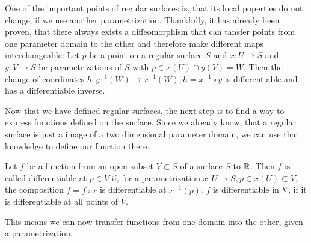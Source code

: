One of the important points of regular surfaces is, that its local poperties do not change, if we use another parametrization.
Thankfully, it has already been proven, that there always exists a diffeomorphism that can tansfer points from one parameter domain to the other and therefore make different maps interchangeable:
Let $p$ be a point on a regular surface $S$ and $x: U \rightarrow S$ and $y: V \rightarrow S$ be parametrizations of $S$ with $p \in x(U) \cap y(V) = W$.
Then the change of coordinates $h: y^{-1}(W) \rightarrow x^{-1}(W), h = x^{-1} \circ y$ is differentiable and has a differentiable inverse.

Now that we have defined regular surfaces, the next step is to find a way to express functions defined on the surface.
Since we already know, that a regular surface is just a image of a two dimensional parameter domain, we can use that knowledge to define our function there.
\begin{mydef}
	Let $f$ be a function from an open subset $V \subset S$ of a surface $S$ to $\mathbb{R}$.
	Then $f$ is called differentiable at $p \in V$ if, for a parametrization $x: U \rightarrow S, p \in x(U) \subset V$, the composition $\tilde{f} = f \circ x$ is differentiable at $x^{-1}(p)$.
	$f$ is differentiable in V, if it is differentiable at all points of $V$.
\end{mydef}
This means we can now transfer functions from one domain into the other, given a parametrization.

